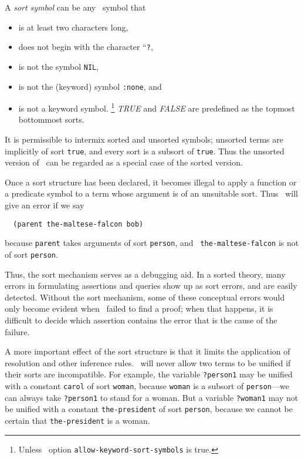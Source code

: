 A {\em sort symbol}
can be any \lisp\   symbol that
\begin{itemize}
\item is at least two characters long,
\item does not begin with the character ``{\tt ?},
\item is not the symbol {\tt NIL},
\item is not the (keyword) symbol {\tt :none}, and
\item is not a keyword symbol.
\footnote{Unless \snark\  option
{\tt allow-keyword-sort-symbols} is true.}
{\em TRUE} and {\em FALSE} are predefined as the topmost
bottommost sorts.
\end{itemize}


It is permissible to intermix sorted and unsorted symbols;  unsorted
terms are implicitly of sort {\tt true}, and every sort is a subsort
of {\tt true}.  Thus the unsorted version of \snark\  can be regarded
as a special case of the sorted version.

Once a sort structure has been declared, it becomes illegal to apply a
function or a predicate symbol to a term whose argument is of an
unsuitable sort.  Thus \snark\  will give an error if we say
\begin{verbatim}
  (parent the-maltese-falcon bob)
\end{verbatim}
because {\tt parent} takes arguments of sort {\tt person}, and {\tt
the-maltese-falcon} is not of sort {\tt person}.

Thus, the sort mechanism serves as a debugging aid.  In a sorted
theory, many errors in formulating assertions and queries show up as
sort errors, and are easily detected.  Without the sort mechanism,
some of these conceptual errors would only become evident when \snark\
failed to find a proof; when that happens, it is difficult to decide
which assertion contains the error that is the cause of the failure.

A more important effect of the sort structure is that it limits the
application of resolution and other inference rules.  \Snark\  will
never allow two terms to be unified if their sorts are incompatible.
For example, the variable {\tt ?person1} may be unified with a
constant {\tt carol} of sort {\tt woman}, because {\tt woman} is a
subsort of {\tt person}---we can always take {\tt ?person1} to stand
for a woman.  But a variable {\tt ?woman1} may not be unified with a
constant {\tt the-president} of sort {\tt person}, because we cannot
be certain that {\tt the-president} is a woman.

